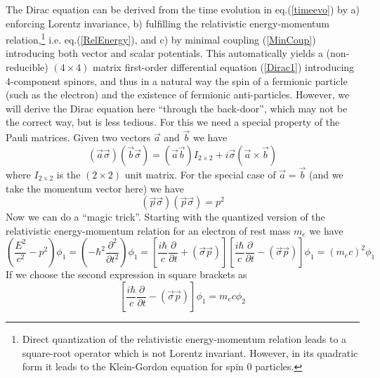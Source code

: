 \documentclass[12pt]{article}
\begin{document}
The Dirac equation can be derived from the time evolution in eq.(\ref{timeevo}) by a) enforcing Lorentz invariance, b) fulfilling the relativistic energy-momentum relation,\footnote{Direct quantization of the relativistic energy-momentum relation leads to a square-root operator which is not Lorentz invariant. However, in its quadratic form it leads to the Klein-Gordon equation for spin 0 particles.} i.e. eq.(\ref{RelEnergy}), 
and c) by minimal coupling (\ref{MinCoup}) introducing both vector and scalar potentials. This automatically yields a (non-reducible) $(4\times 4)$ matrix first-order differential equation (\ref{Dirac1}) introducing 4-component spinors, and thus in a natural way the spin of a fermionic particle (such as the electron) and the existence of fermionic anti-particles. However, we will derive the Dirac equation here ``through the back-door'', which may not be the correct way, but is less tedious. For this we need a special property of the Pauli matrices. Given two vectors $\vec{a}$ and $\vec{b}$ we have
\begin{equation}
   \left(\vec{a}\vec{\sigma} \right) \left(\vec{b}\vec{\sigma} \right) = \left(\vec{a}\vec{b} \right) I_{2\times 2} + i\vec{\sigma} \left(\vec{a}\times \vec{b} \right)
   \label{PropPauli}
\end{equation}
where $I_{2\times 2}$ is the $(2\times 2)$ unit matrix. For the special case of $\vec{a}=\vec{b}$ (and we take the momentum vector here) we have
\begin{equation}
   \left(\vec{p}\vec{\sigma} \right) \left(\vec{p}\vec{\sigma} \right) = p^2
   \label{PropPauli1}
\end{equation}
Now we can do a ``magic trick''. Starting with the quantized version of the relativistic energy-momentum relation for an electron of rest mass $m_e$ we have
\begin{equation}
   \left(\frac{E^2}{c^2}-p^2\right)\phi_1 = \left( -\hbar^2 \frac{\partial^2}{\partial t^2} \right)\phi_1 = \left[ \frac{i\hbar}{c} \frac{\partial}{\partial t} + \left(\vec{\sigma}\vec{p}\right) \right] \left[ \frac{i\hbar}{c} \frac{\partial}{\partial t} - \left(\vec{\sigma}\vec{p}\right) \right]\phi_1 = \left( m_ec\right)^2\phi_1
   \label{QuantEnerMom}
\end{equation}
If we choose the second expression in square brackets as
\begin{equation}
   \left[ \frac{i\hbar}{c} \frac{\partial}{\partial t} - \left(\vec{\sigma}\vec{p}\right) \right]\phi_1 = m_ec\phi_2
   \label{QuantEnerMom1}
\end{equation}
\end{document}
